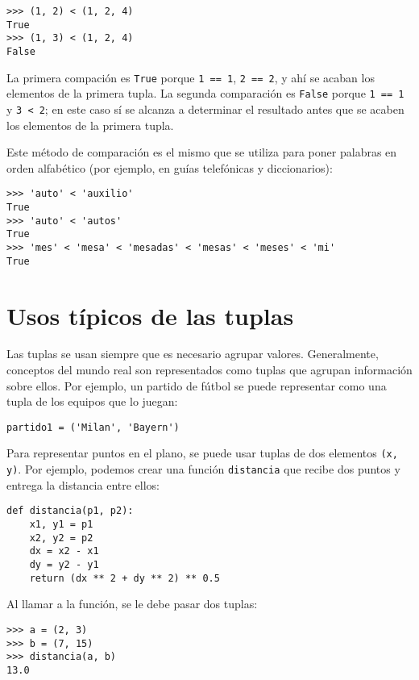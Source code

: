 \begin{lstlisting}
>>> (1, 2) < (1, 2, 4)
True
>>> (1, 3) < (1, 2, 4)
False
\end{lstlisting}

La primera compación es \lstinline!True! porque \lstinline!1 == 1!,
\lstinline!2 == 2!, y ahí se acaban los elementos de la primera tupla.
La segunda comparación es \lstinline!False! porque \lstinline!1 == 1! y
\lstinline!3 < 2!; en este caso sí se alcanza a determinar el resultado
antes que se acaben los elementos de la primera tupla.

Este método de comparación es el mismo que se utiliza para poner
palabras en orden alfabético (por ejemplo, en guías telefónicas y
diccionarios):

\begin{lstlisting}
>>> 'auto' < 'auxilio'
True
>>> 'auto' < 'autos'
True
>>> 'mes' < 'mesa' < 'mesadas' < 'mesas' < 'meses' < 'mi'
True
\end{lstlisting}

\section{Usos típicos de las tuplas}

Las tuplas se usan siempre que es necesario agrupar valores.
Generalmente, conceptos del mundo real son representados como tuplas que
agrupan información sobre ellos. Por ejemplo, un partido de fútbol se
puede representar como una tupla de los equipos que lo juegan:

\begin{lstlisting}
partido1 = ('Milan', 'Bayern')
\end{lstlisting}

Para representar puntos en el plano, se puede usar tuplas de dos
elementos \lstinline!(x, y)!. Por ejemplo, podemos crear una función
\lstinline!distancia! que recibe dos puntos y entrega la distancia entre
ellos:

\begin{lstlisting}
def distancia(p1, p2):
    x1, y1 = p1
    x2, y2 = p2
    dx = x2 - x1
    dy = y2 - y1
    return (dx ** 2 + dy ** 2) ** 0.5
\end{lstlisting}

Al llamar a la función, se le debe pasar dos tuplas:

\begin{lstlisting}
>>> a = (2, 3)
>>> b = (7, 15)
>>> distancia(a, b)
13.0
\end{lstlisting}

